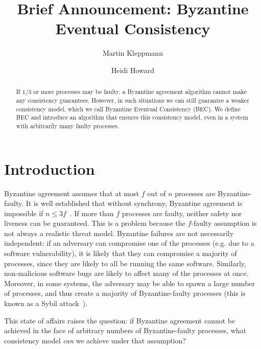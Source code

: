 \documentclass[manuscript,anonymous]{acmart}
\begin{document}
\title{Brief Announcement: Byzantine Eventual Consistency}
\author{Martin Kleppmann}

\author{Heidi Howard}

\begin{abstract}
    If $1/3$ or more processes may be faulty, a Byzantine agreement algorithm cannot make any consistency guarantees.
    However, in such situations we can still guarantee a weaker consistency model, which we call Byzantine Eventual Consistency (BEC).
    We define BEC and introduce an algorithm that ensures this consistency model, even in a system with arbitrarily many faulty processes.
\end{abstract}
\maketitle

\section{Introduction}

Byzantine agreement assumes that at most $f$ out of $n$ processes are Byzantine-faulty.
It is well established that without synchrony, Byzantine agreement is impossible if $n\leq3f$~\cite{Lamport:1982,Dwork:1988,Fischer:1985}.
If more than $f$ processes are faulty, neither safety nor liveness can be guaranteed.
This is a problem because the $f$-faulty assumption is not always a realistic threat model.
Byzantine failures are not necessarily independent: if an adversary can compromise one of the processes (e.g. due to a software vulnerability), it is likely that they can compromise a majority of processes, since they are likely to all be running the same software. 
Similarly, non-malicious software bugs are likely to affect many of the processes at once.
Moreover, in some systems, the adversary may be able to spawn a large number of processes, and thus create a majority of Byzantine-faulty processes (this is known as a Sybil attack~\cite{Douceur:2002jr}).

This state of affairs raises the question: if Byzantine agreement cannot be achieved in the face of arbitrary numbers of Byzantine-faulty processes, what consistency model \emph{can} we achieve under that assumption?
\end{document}
